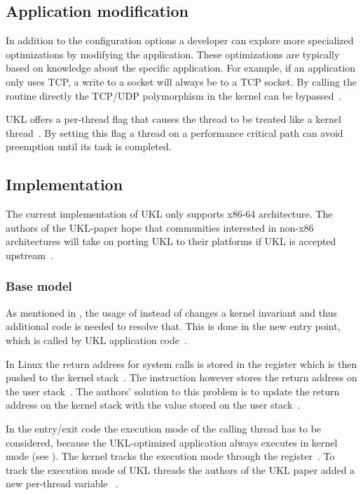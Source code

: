 \documentclass[10pt,twocolumn,a4paper]{article}
\begin{document}
  \subsection{Application modification}\label{sec:application-modification}
    In addition to the configuration options a developer can explore more specialized optimizations
    by modifying the application.
    These optimizations are typically based on knowledge about the specific application.
    For example, if an application only uses TCP, a write to a socket will always be to
    a TCP socket.
    By calling the  routine directly the TCP/UDP polymorphism in the kernel
    can be bypassed~\cite{raza23}.
    
    UKL offers a per-thread flag that causes the thread to be treated like a kernel thread~\cite{raza23}.
    By setting this flag a thread on a performance critical path can avoid preemption
    until its task is completed.

  \subsection{Implementation}
    The current implementation of UKL only supports x86-64 architecture.
    The authors of the UKL-paper hope that communities interested in non-x86 architectures
    will take on porting UKL to their platforms if UKL is accepted upstream~\cite{raza23}.

    \subsubsection{Base model}\label{sec:imp:base-model}
      As mentioned in , the usage of  instead of 
      changes a kernel invariant and thus additional code is needed to resolve that.
      This is done in the new  entry point, which is called by
      UKL application code~\cite{raza23, ukl-glibc-syscalls}.

      In Linux the return address for system calls is stored in the  register which is then 
      pushed to the kernel stack~\cite{raza23}.
      The  instruction however stores the return address on the user stack~\cite{raza23}.
      The authors' solution to this problem is to update the return address on the kernel
      stack with the value stored on the user stack~\cite{ukl-github-entry}.

      In the entry/exit code the execution mode of the calling thread has to be considered,
      because the UKL-optimized application always executes in kernel mode (see ).
      The kernel tracks the execution mode through the  register~\cite{raza23}.
      To track the execution mode of UKL threads the authors of the UKL paper added a 
      new per-thread variable ~\cite{ukl-github-entry, ukl-github-inuser-add}.
\end{document}
